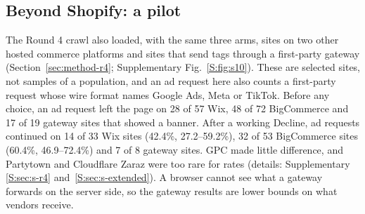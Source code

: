 \subsection{Beyond Shopify: a pilot}\label{sec:res-beyond}

The Round 4 crawl also loaded, with the same three arms, sites on two other hosted commerce platforms and sites that send tags through a first-party gateway (Section~\ref{sec:method-r4}; Supplementary Fig.~\ref*{S:fig:s10}). These are selected sites, not samples of a population, and an ad request here also counts a first-party request whose wire format names Google Ads, Meta or TikTok. Before any choice, an ad request left the page on 28 of 57 Wix, 48 of 72 BigCommerce and 17 of 19 gateway sites that showed a banner. After a working Decline, ad requests continued on 14 of 33 Wix sites (42.4\%, 27.2--59.2\%), 32 of 53 BigCommerce sites (60.4\%, 46.9--72.4\%) and 7 of 8 gateway sites. GPC made little difference, and Partytown and Cloudflare Zaraz were too rare for rates (details: Supplementary \ref*{S:sec:s-r4} and~\ref*{S:sec:s-extended}). A browser cannot see what a gateway forwards on the server side, so the gateway results are lower bounds on what vendors receive.
